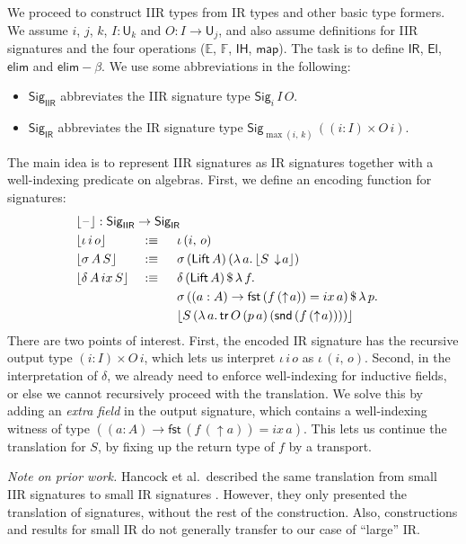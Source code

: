 \documentclass[acmsmall,screen,review,anonymous]{acmart}
\newcommand{\msf}[1]{{\mathsf{#1}}}
\newcommand{\mbb}[1]{\mathbb{#1}}
\newcommand{\U}{\msf{U}}
\newcommand{\El}{\msf{El}}
\newcommand{\Lift}{\msf{Lift}}
\newcommand{\lup}{\uparrow}
\newcommand{\ldown}{\downarrow}
\newcommand{\Sig}{\msf{Sig}}
\newcommand{\blank}{{\mathord{\hspace{1pt}\text{--}\hspace{1pt}}}}
\newcommand{\ix}{{ix}}
\newcommand{\IR}{\msf{IR}}
\newcommand{\IH}{\msf{IH}}
\newcommand{\map}{\msf{map}}
\newcommand{\elim}{\msf{elim}}
\newcommand{\tr}{\msf{tr}}
\newcommand{\fst}{\msf{fst}}
\newcommand{\snd}{\msf{snd}}
\newcommand{\IIR}{\msf{IIR}}
\newcommand{\Sigr}[1]{\lfloor #1 \rfloor}
\newcommand{\E}{\mbb{E}}
\newcommand{\F}{\mbb{F}}
\begin{document}
We proceed to construct IIR types from IR types and other basic type formers. We assume $i$, $j$,
$k$, $I : \U_k$ and $O : I \to \U_j$, and also assume definitions for IIR signatures and the four
operations ($\E$, $\F$, $\IH$, $\map$). The task is to define $\IR$,
$\El$, $\elim$ and $\elim\!-\!\!\beta$. We use some abbreviations in the following:
\begin{itemize}
\item $\Sig_\IIR$ abbreviates the IIR signature type $\Sig_i\,I\,O$.
\item $\Sig_\IR$ abbreviates the IR signature type $\Sig_{\max(i,\,k)}\,((i : I) \times O\,i)$.
\end{itemize}
The main idea is to represent IIR signatures as IR signatures together with a
well-indexing predicate on algebras. First, we define an encoding function for signatures:
\begin{alignat*}{4}
  & \rlap{$\Sigr{\blank} : \Sig_\IIR \to \Sig_\IR$}\\
  & \Sigr{\iota\,i\,o}       &&:\equiv \hspace{0.5em} &&\iota\,(i,\,o)\\
  & \Sigr{\sigma\,A\,S}      &&:\equiv \hspace{0.5em} &&\sigma\,(\Lift\,A)\,(\lambda\,a.\,\Sigr{S\,\ldown\!a})\\
  & \Sigr{\delta\,A\,\ix\,S} &&:\equiv \hspace{0.5em} &&\delta\,(\Lift\,A)\,\$\,\lambda\,f.\\
  &  &&                                &&\sigma\,((a : A) \to \fst\,(f\,(\lup\!a)) = \ix\,a)\,\$\,\lambda\,p.\\
  &  &&                                &&\Sigr{S\,(\lambda\,a.\,\tr\,O\,(p\,a)\,(\snd\,(f\,(\lup\! a))))}
\end{alignat*}
There are two points of interest. First, the encoded IR signature has the recursive output type $(i
: I) \times O\,i$, which lets us interpret $\iota\,i\,o$ as $\iota\,(i,\,o)$. Second, in the
interpretation of $\delta$, we already need to enforce well-indexing for inductive fields, or else
we cannot recursively proceed with the translation. We solve this by adding an \emph{extra field} in
the output signature, which contains a well-indexing witness of type $((a : A) \to \fst\,(f\,(\lup\!a)) = \ix\,a)$.
This lets us continue the translation for $S$, by fixing up the return type of $f$ by a transport.

\emph{Note on prior work.} Hancock et al.\ described the same translation from small IIR signatures
to small IR signatures \cite[Section~6]{DBLP:conf/tlca/HancockMGMA13}. However, they only presented
the translation of signatures, without the rest of the construction. Also, constructions and results
for small IR do not generally transfer to our case of ``large'' IR.
\end{document}
